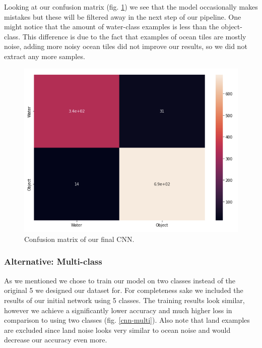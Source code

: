 Looking at our confusion matrix (fig. \ref{bin-confusion}) we see that the model occasionally makes mistakes but these will be filtered away in the next step of our pipeline. One might notice that the amount of water-class examples is less than the object-class. This difference is due to the fact that examples of ocean tiles are mostly noise, adding more noisy ocean tiles did not improve our results, so we did not extract any more samples.

\begin{figure}[ht]
\begin{center}
\centerline{\includegraphics[width=\columnwidth]{images/bin-confusion.png}}
\caption{Confusion matrix of our final CNN.}
\label{bin-confusion}
\end{center}
\end{figure}

\subsubsection{Alternative: Multi-class}

As we mentioned we chose to train our model on two classes instead of the original 5 we designed our dataset for. For completeness sake we included the results of our initial network using 5 classes. The training results look similar, however we achieve a significantly lower accuracy and much higher loss in comparison to using two classes (fig. \ref{cnn-multi}). Also note that land examples are excluded since land noise looks very similar to ocean noise and would decrease our accuracy even more.

